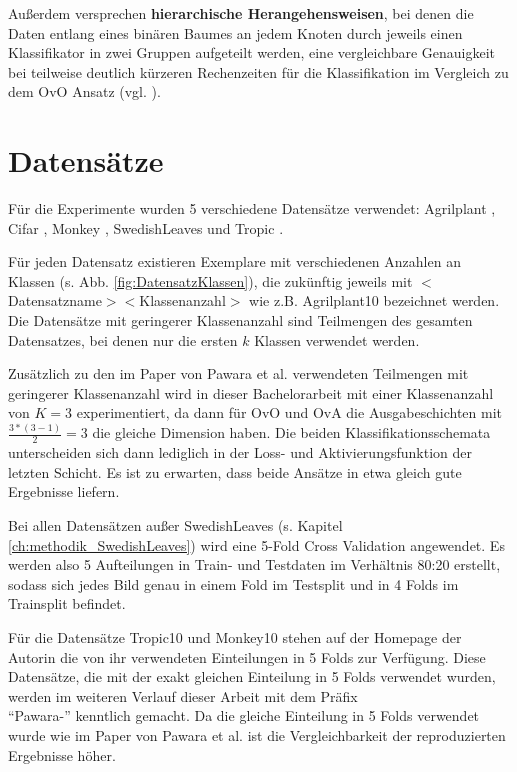 Außerdem versprechen \textbf{hierarchische Herangehensweisen}, bei denen die Daten entlang eines binären Baumes an jedem Knoten durch jeweils einen Klassifikator in zwei Gruppen aufgeteilt werden, eine vergleichbare Genauigkeit bei teilweise deutlich kürzeren Rechenzeiten für die Klassifikation im Vergleich zu dem OvO Ansatz (vgl. \cite{hierarchischeMethoden}).

\newpage
\section{Datensätze}
\label{ch:methodik_datensaetze}
Für die Experimente wurden 5 verschiedene Datensätze verwendet: Agrilplant \cite{pawaraWebsiteDatensaetze}, Cifar \cite{cifar10}, Monkey \cite{pawaraWebsiteDatensaetze}, SwedishLeaves \cite{swedishLeaves} und Tropic \cite{pawaraWebsiteDatensaetze}.

Für jeden Datensatz existieren Exemplare mit verschiedenen Anzahlen an Klassen (s. Abb. \ref{fig:DatensatzKlassen}), die zukünftig jeweils mit $<$Datensatzname$><$Klassenanzahl$>$ wie z.B. Agrilplant10 bezeichnet werden.
Die Datensätze mit geringerer Klassenanzahl sind Teilmengen des gesamten Datensatzes, bei denen nur die ersten $k$ Klassen verwendet werden.

Zusätzlich zu den im Paper von Pawara et al. \cite{pawaraPaper} verwendeten Teilmengen mit geringerer Klassenanzahl wird in dieser Bachelorarbeit mit einer Klassenanzahl von $K=3$ experimentiert, da dann für OvO und OvA die Ausgabeschichten mit $\frac{3*(3-1)}{2} = 3$ die gleiche Dimension haben. Die beiden Klassifikationsschemata unterscheiden sich dann lediglich in der Loss- und Aktivierungsfunktion der letzten Schicht. Es ist zu erwarten, dass beide Ansätze in etwa gleich gute Ergebnisse liefern.

Bei allen Datensätzen außer SwedishLeaves (s. Kapitel \ref{ch:methodik_SwedishLeaves}) wird eine 5-Fold Cross Validation angewendet. Es werden also 5 Aufteilungen in Train- und Testdaten im Verhältnis 80:20 erstellt, sodass sich jedes Bild genau in einem Fold im Testsplit und in 4 Folds im Trainsplit befindet.

Für die Datensätze Tropic10 und Monkey10 stehen auf der Homepage der Autorin \cite{pawaraWebsiteDatensaetze} die von ihr verwendeten Einteilungen in 5 Folds zur Verfügung. Diese Datensätze, die mit der exakt gleichen Einteilung in 5 Folds verwendet wurden, werden im weiteren Verlauf dieser Arbeit mit dem Präfix\\ \enquote{Pawara-} kenntlich gemacht. Da die gleiche Einteilung in 5 Folds verwendet wurde wie im Paper von Pawara et al. \cite{pawaraPaper} ist die Vergleichbarkeit der reproduzierten Ergebnisse höher.

